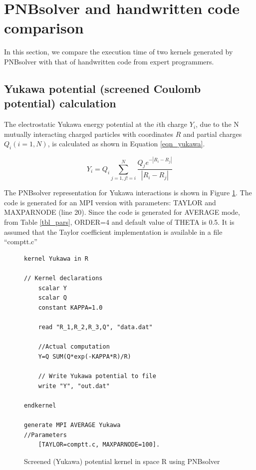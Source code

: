 \documentclass[draftclsnofoot]{elsarticle}
\begin{document}
\section{PNBsolver and handwritten code comparison}
\label{sec_cmp}

In this section, we compare the execution time of two kernels generated by PNBsolver with that of handwritten code from expert programmers.  

\subsection {Yukawa potential (screened Coulomb potential) calculation}

The electrostatic Yukawa energy potential at the $i$th charge $Y_i$, due to the N mutually interacting  charged particles 
 with coordinates $R$  and partial charges $Q_i(i=1,N)$, is calculated as shown in Equation \ref{eqn_yukawa}.

\begin{equation}
\label{eqn_yukawa}
Y_i=Q_i \sum \limits_{j=1,j!=i}^{N} \frac{Q_je^{-|R_i-R_j|}}{|R_i- R_j|} 
\end{equation}

The PNBsolver representation for Yukawa interactions is shown in Figure \ref{fig_yukawa}. The code is generated for an MPI version with parameters: 
TAYLOR and MAXPARNODE (line 20). Since the code is generated for AVERAGE mode, from Table \ref{tbl_pars}, ORDER=4 and default value of THETA is 0.5.   
It is assumed that the Taylor coefficient implementation is available in a file ``comptt.c'' 

\begin{figure}[!t]
\centering
\begin{lstlisting}[style=AMMA, language=PNB]
kernel Yukawa in R

// Kernel declarations
	scalar Y
	scalar Q
	constant KAPPA=1.0
	
	read "R_1,R_2,R_3,Q", "data.dat"

	//Actual computation
	Y=Q SUM(Q*exp(-KAPPA*R)/R)

	// Write Yukawa potential to file 
	write "Y", "out.dat"
	
endkernel

generate MPI AVERAGE Yukawa 
//Parameters
	[TAYLOR=comptt.c, MAXPARNODE=100]. 
\end{lstlisting}
\caption{Screened (Yukawa) potential kernel in space R using PNBsolver}
\label{fig_yukawa}
\end{figure}
\end{document}
